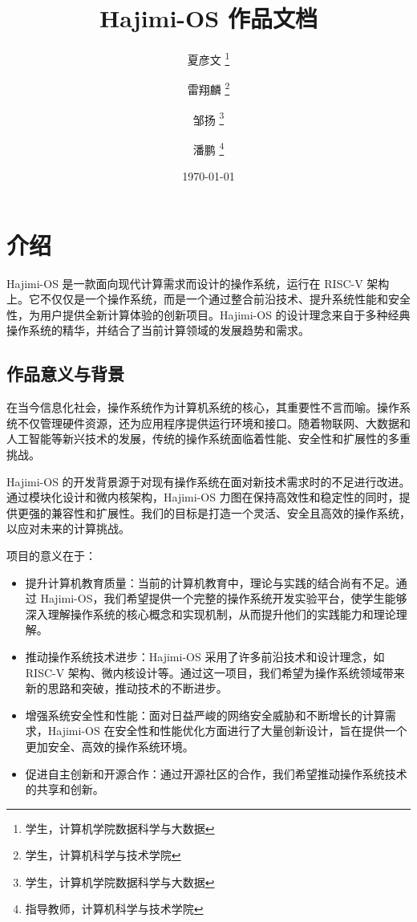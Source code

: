 \documentclass[UTF8]{article}
\begin{document}
\title{\Huge Hajimi-OS 作品文档}
\author{夏彦文 \thanks{学生，计算机学院数据科学与大数据} \and 雷翔麟 \thanks{学生，计算机科学与技术学院}
  \and 邹扬 \thanks{学生，计算机学院数据科学与大数据} \and 潘鹏 \thanks{指导教师，计算机科学与技术学院}}
\date{\today}
\maketitle

\newpage
\tableofcontents
\newpage


\section{介绍}
Hajimi-OS 是一款面向现代计算需求而设计的操作系统，运行在 RISC-V 架构上。它不仅仅是一个操作系统，而是一个通过整合前沿技术、提升系统性能和安全性，为用户提供全新计算体验的创新项目。Hajimi-OS 的设计理念来自于多种经典操作系统的精华，并结合了当前计算领域的发展趋势和需求。

\subsection{作品意义与背景}
在当今信息化社会，操作系统作为计算机系统的核心，其重要性不言而喻。操作系统不仅管理硬件资源，还为应用程序提供运行环境和接口。随着物联网、大数据和人工智能等新兴技术的发展，传统的操作系统面临着性能、安全性和扩展性的多重挑战。

Hajimi-OS 的开发背景源于对现有操作系统在面对新技术需求时的不足进行改进。通过模块化设计和微内核架构，Hajimi-OS 力图在保持高效性和稳定性的同时，提供更强的兼容性和扩展性。我们的目标是打造一个灵活、安全且高效的操作系统，以应对未来的计算挑战。

项目的意义在于：
\begin{itemize}
  \item 提升计算机教育质量：当前的计算机教育中，理论与实践的结合尚有不足。通过 Hajimi-OS，我们希望提供一个完整的操作系统开发实验平台，使学生能够深入理解操作系统的核心概念和实现机制，从而提升他们的实践能力和理论理解。
  \item 推动操作系统技术进步：Hajimi-OS 采用了许多前沿技术和设计理念，如 RISC-V 架构、微内核设计等。通过这一项目，我们希望为操作系统领域带来新的思路和突破，推动技术的不断进步。
  \item 增强系统安全性和性能：面对日益严峻的网络安全威胁和不断增长的计算需求，Hajimi-OS 在安全性和性能优化方面进行了大量创新设计，旨在提供一个更加安全、高效的操作系统环境。
  \item 促进自主创新和开源合作：通过开源社区的合作，我们希望推动操作系统技术的共享和创新。
\end{itemize}
\end{document}
